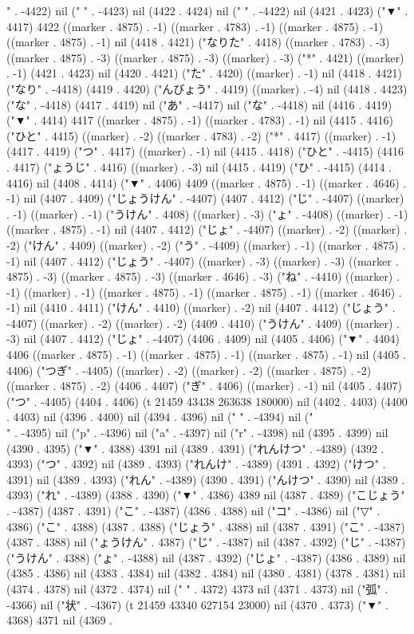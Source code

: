 {" . -4422) nil (" " . -4423) nil (4422 . 4424) nil (" " . -4422) nil (4421 . 4423) ("▼" . 4417) 4422 ((marker . 4875) . -1) ((marker . 4783) . -1) ((marker . 4875) . -1) ((marker . 4875) . -1) nil (4418 . 4421) ("なりた" . 4418) ((marker . 4783) . -3) ((marker . 4875) . -3) ((marker . 4875) . -3) ((marker) . -3) ("*" . 4421) ((marker) . -1) (4421 . 4423) nil (4420 . 4421) ("た" . 4420) ((marker) . -1) nil (4418 . 4421) ("なり" . -4418) (4419 . 4420) ("んびょう" . 4419) ((marker) . -4) nil (4418 . 4423) ("な" . -4418) (4417 . 4419) nil ("あ" . -4417) nil ("な" . -4418) nil (4416 . 4419) ("▼" . 4414) 4417 ((marker . 4875) . -1) ((marker . 4783) . -1) nil (4415 . 4416) ("ひと" . 4415) ((marker) . -2) ((marker . 4783) . -2) ("*" . 4417) ((marker) . -1) (4417 . 4419) ("つ" . 4417) ((marker) . -1) nil (4415 . 4418) ("ひと" . -4415) (4416 . 4417) ("ょうじ" . 4416) ((marker) . -3) nil (4415 . 4419) ("ひ" . -4415) (4414 . 4416) nil (4408 . 4414) ("▼" . 4406) 4409 ((marker . 4875) . -1) ((marker . 4646) . -1) nil (4407 . 4409) ("じょうけん" . -4407) (4407 . 4412) ("じ" . -4407) ((marker) . -1) ((marker) . -1) ("うけん" . 4408) ((marker) . -3) ("ょ" . -4408) ((marker) . -1) ((marker . 4875) . -1) nil (4407 . 4412) ("じょ" . -4407) ((marker) . -2) ((marker) . -2) ("けん" . 4409) ((marker) . -2) ("う" . -4409) ((marker) . -1) ((marker . 4875) . -1) nil (4407 . 4412) ("じょう" . -4407) ((marker) . -3) ((marker) . -3) ((marker . 4875) . -3) ((marker . 4875) . -3) ((marker . 4646) . -3) ("ね" . -4410) ((marker) . -1) ((marker) . -1) ((marker . 4875) . -1) ((marker . 4875) . -1) ((marker . 4646) . -1) nil (4410 . 4411) ("けん" . 4410) ((marker) . -2) nil (4407 . 4412) ("じょう" . -4407) ((marker) . -2) ((marker) . -2) (4409 . 4410) ("うけん" . 4409) ((marker) . -3) nil (4407 . 4412) ("じょ" . -4407) (4406 . 4409) nil (4405 . 4406) ("▼" . 4404) 4406 ((marker . 4875) . -1) ((marker . 4875) . -1) ((marker . 4875) . -1) nil (4405 . 4406) ("つぎ" . -4405) ((marker) . -2) ((marker) . -2) ((marker . 4875) . -2) ((marker . 4875) . -2) (4406 . 4407) ("ぎ" . 4406) ((marker) . -1) nil (4405 . 4407) ("つ" . -4405) (4404 . 4406) (t 21459 43438 263638 180000) nil (4402 . 4403) (4400 . 4403) nil (4396 . 4400) nil (4394 . 4396) nil (" " . -4394) nil ("\\" . -4395) nil ("p" . -4396) nil ("a" . -4397) nil ("r" . -4398) nil (4395 . 4399) nil (4390 . 4395) ("▼" . 4388) 4391 nil (4389 . 4391) ("れんけつ" . -4389) (4392 . 4393) ("つ" . 4392) nil (4389 . 4393) ("れんけ" . -4389) (4391 . 4392) ("けつ" . 4391) nil (4389 . 4393) ("れん" . -4389) (4390 . 4391) ("んけつ" . 4390) nil (4389 . 4393) ("れ" . -4389) (4388 . 4390) ("▼" . 4386) 4389 nil (4387 . 4389) ("こじょう" . -4387) (4387 . 4391) ("こ" . -4387) (4386 . 4388) nil ("コ" . -4386) nil ("▽" . 4386) ("こ" . 4388) (4387 . 4388) ("じょう" . 4388) nil (4387 . 4391) ("こ" . -4387) (4387 . 4388) nil ("ょうけん" . 4387) ("じ" . -4387) nil (4387 . 4392) ("じ" . -4387) ("うけん" . 4388) ("ょ" . -4388) nil (4387 . 4392) ("じょ" . -4387) (4386 . 4389) nil (4385 . 4386) nil (4383 . 4384) nil (4382 . 4384) nil (4380 . 4381) (4378 . 4381) nil (4374 . 4378) nil (4372 . 4374) nil (" " . 4372) 4373 nil (4371 . 4373) nil ("弧" . -4366) nil ("状" . -4367) (t 21459 43340 627154 23000) nil (4370 . 4373) ("▼" . 4368) 4371 nil (4369 . }
